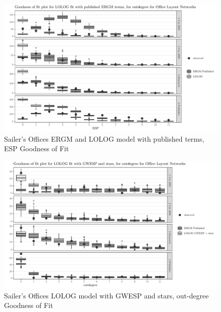 \documentclass[
]{statsoc}
\begin{document}
\begin{figure}[h]

{\centering \includegraphics{lolog_catelog_writeup_JRSSA_major_revisions_git_files/figure-latex/unnamed-chunk-10-1} 

}

\caption{\label{fig:sailer_gof_pub_esp} Sailer's Offices ERGM and LOLOG model with published terms, ESP Goodness of Fit}\label{fig:unnamed-chunk-10}
\end{figure}

\begin{figure}[h]

{\centering \includegraphics{lolog_catelog_writeup_JRSSA_major_revisions_git_files/figure-latex/unnamed-chunk-11-1} 

}

\caption{\label{fig:sailer_gof_gwesp_star_odeg} Sailer's Offices LOLOG model with GWESP and stars, out-degree Goodness of Fit}\label{fig:unnamed-chunk-11}
\end{figure}
\end{document}
